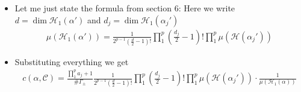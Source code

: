 \documentclass[20pt]{article}
\theoremstyle{definition}
\begin{document}
    \begin{itemize}
        \item Let me just state the formula from section 6: Here we write \(d = \dim \mathcal{H}_1(\alpha')\) and \(d_j = \dim \mathcal{H}_1(\alpha_j')\)
        \begin{align*}
            \mu(\mathcal{H}_1(\alpha')) = \frac{1}{2^{p-1} (\frac{d}{2} - 1)!}\prod_1^p (\frac{d_j}{2} - 1)! \prod_1^p\mu(\mathcal{H}(\alpha_j'))
        \end{align*}
        \item Substituting everything we get
        \begin{align*}
            c(\alpha, \mathcal{C}) = \frac{\prod_1^p a_j + 1}{\# \Gamma_{\pm}}\frac{1}{2^{p-1} (\frac{d}{2} - 1)!}\prod_1^p (\frac{d_j}{2} - 1)! \prod_1^p\mu(\mathcal{H}(\alpha_j')) \cdot \frac{1}{\mu(\mathcal{H}_1(\alpha))}
        \end{align*}
    \end{itemize}
\end{document}
